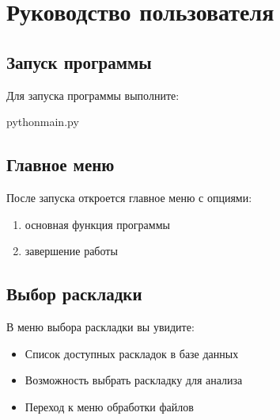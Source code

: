 \documentclass[a4paper,11pt,russian,openany,oneside]{sphinxmanual}
\begin{document}
\sphinxstepscope


\section{Руководство пользователя}
\label{\detokenize{usage:id1}}\label{\detokenize{usage::doc}}

\subsection{Запуск программы}
\label{\detokenize{usage:id2}}
\sphinxAtStartPar
Для запуска программы выполните:

\begin{sphinxVerbatim}[commandchars=\\\{\}]
pythonmain.py
\end{sphinxVerbatim}


\subsection{Главное меню}
\label{\detokenize{usage:id3}}
\sphinxAtStartPar
После запуска откроется главное меню с опциями:
\begin{enumerate}
%
\item {} 
\sphinxAtStartPar
{} \sphinxhyphen{} основная функция программы

\item {} 
\sphinxAtStartPar
{} \sphinxhyphen{} завершение работы

\end{enumerate}


\subsection{Выбор раскладки}
\label{\detokenize{usage:id4}}
\sphinxAtStartPar
В меню выбора раскладки вы увидите:
\begin{itemize}
\item {} 
\sphinxAtStartPar
Список доступных раскладок в базе данных

\item {} 
\sphinxAtStartPar
Возможность выбрать раскладку для анализа

\item {} 
\sphinxAtStartPar
Переход к меню обработки файлов

\end{itemize}
\end{document}
